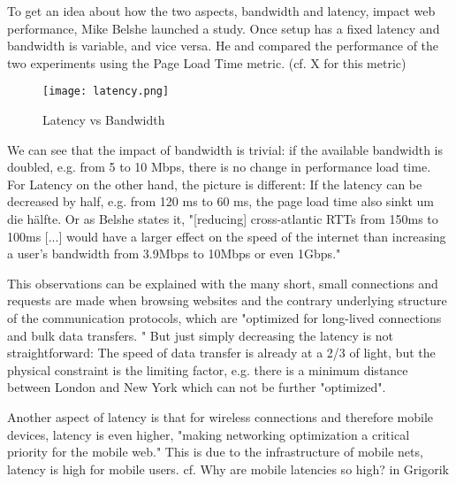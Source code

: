 
To get an idea about how the two aspects, bandwidth and latency, impact web performance,  Mike Belshe launched a study. %
Once setup has a fixed latency and bandwidth is variable, and vice versa.
He and compared the performance of the two experiments using the Page Load Time metric. (cf. X for this metric)


\begin{figure}[h!]
\begin{center}
\texttt{[image: latency.png]}
\caption{Latency vs Bandwidth}
\label{img:latency}
\end{center}
\end{figure}


We can see that the impact of bandwidth is trivial: if the available bandwidth is doubled, e.g. from 5 to 10 Mbps, there is no change in performance load time.
For Latency on the other hand, the picture is different: If the latency can be decreased by half, e.g. from 120 ms to 60 ms, the page load time also sinkt um die hälfte.
Or as Belshe states it, "[reducing] cross-atlantic RTTs from 150ms to 100ms [...] would have a larger effect on the speed of the internet than increasing a user's bandwidth from 3.9Mbps to 10Mbps or even 1Gbps." %

This observations can be explained with the many short, small connections and requests are made when browsing websites and the contrary underlying structure of the communication protocols, which are "optimized for long-lived connections and bulk data transfers. " %
But just simply decreasing the latency is not straightforward: The speed of data transfer is already at a 2/3 of light, but the physical constraint is the limiting factor, e.g. there is a minimum distance between London and New York which can not be further "optimized". %



Another aspect of latency is that for wireless connections and therefore mobile devices, latency is even higher, "making networking optimization a critical priority for the mobile web." %
This is due to the infrastructure of mobile nets, latency is high for mobile users. cf.  Why are mobile latencies so high? in Grigorik %


